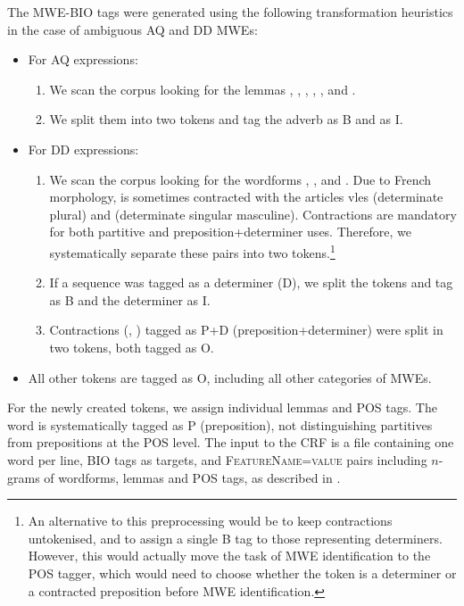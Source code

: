 \documentclass[output=paper,
modfonts
]{langscibook}
\begin{document}
The MWE-BIO tags were generated using the following transformation heuristics in the case of ambiguous AQ and DD MWEs: 
\begin{itemize}
  \item For AQ expressions:
  \begin{enumerate}
  \item We scan the corpus looking for the lemmas , , , , ,  and .%
  \item We split them into two tokens and tag the adverb as {\textsc B} and  as {\textsc I}.
  \end{enumerate}
  \item For DD expressions:
  \begin{enumerate}
  \item We scan the corpus looking for the wordforms , ,  and . Due to French morphology,  is sometimes contracted with the articles v{les} (determinate plural) and  (determinate singular masculine). Contractions are mandatory for both partitive and preposition+determiner uses. Therefore, we systematically separate these pairs into two tokens.\footnote{An alternative to this preprocessing would be to keep contractions untokenised, and to assign a single \textsc{B} tag to those representing determiners. However, this would actually move the task of MWE identification to the POS tagger, which would need to choose whether the token is a determiner or a contracted preposition before MWE identification.}
  \item If a sequence was tagged as a determiner ({\textsc D}), we split the tokens and tag  as {\textsc B} and the determiner as {\textsc I}. 
  \item Contractions (, ) tagged as {\textsc P+D} (preposition+determiner) were split in two tokens, both tagged as {\textsc O}.
  \end{enumerate}
  \item All other tokens are tagged as {\textsc O}, including all other categories of MWEs.
\end{itemize}

For the newly created tokens, we assign individual lemmas and POS tags. The word  is systematically tagged as \textsc{P} (preposition), not distinguishing partitives from prepositions at the POS level. The input to the CRF is a file containing one word per line, BIO tags as targets, and \textsc{FeatureName=value} pairs including $n$-grams of wordforms, lemmas and POS tags, as described in . %
\end{document}
